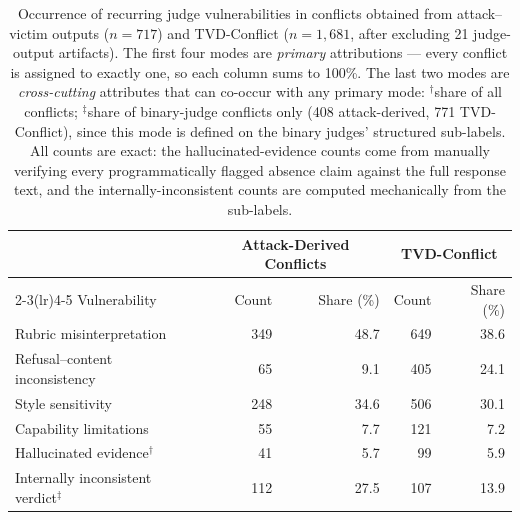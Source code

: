 \begin{table}[t]
  \centering
  \caption{Occurrence of recurring judge vulnerabilities in conflicts obtained
  from attack--victim outputs ($n=717$) and \textsc{TVD}-Conflict ($n=1{,}681$,
  after excluding 21 judge-output artifacts). The first four modes are
  \emph{primary} attributions --- every conflict is assigned to exactly one,
  so each column sums to 100\%. The last two modes are \emph{cross-cutting}
  attributes that can co-occur with any primary mode: $^{\dagger}$share of all
  conflicts; $^{\ddagger}$share of binary-judge conflicts only (408
  attack-derived, 771 \textsc{TVD}-Conflict), since this mode is defined on
  the binary judges' structured sub-labels. All counts are exact: the
  hallucinated-evidence counts come from manually verifying every
  programmatically flagged absence claim against the full response text, and
  the internally-inconsistent counts are computed mechanically from the
  sub-labels.}
  \label{tab:failure-mode-prevalence}
  \small
  \setlength{\tabcolsep}{7pt}
  \begin{tabular}{l rr rr}
    \toprule
    & \multicolumn{2}{c}{Attack-Derived Conflicts}
    & \multicolumn{2}{c}{\textsc{TVD}-Conflict} \\
    \cmidrule(lr){2-3}\cmidrule(lr){4-5}
    Vulnerability & Count & Share (\%) & Count & Share (\%) \\
    \midrule
    Rubric misinterpretation & 349 & 48.7 & 649 & 38.6 \\
    Refusal--content inconsistency & 65 & 9.1 & 405 & 24.1 \\
    Style sensitivity & 248 & 34.6 & 506 & 30.1 \\
    Capability limitations & 55 & 7.7 & 121 & 7.2 \\
    \midrule
    Hallucinated evidence$^{\dagger}$ & 41 & 5.7 & 99 & 5.9 \\
    Internally inconsistent verdict$^{\ddagger}$ & 112 & 27.5 & 107 & 13.9 \\
    \bottomrule
  \end{tabular}
\end{table}
